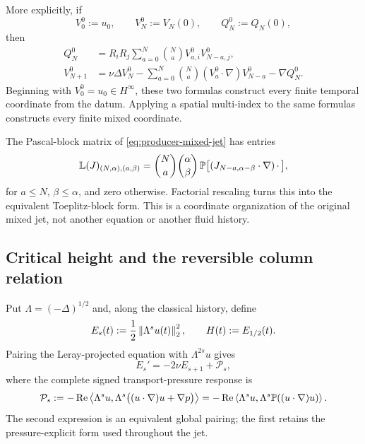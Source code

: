 More explicitly, if
\[
 V_0^0:=u_0,
 \qquad V_N^0:=V_N(0),
 \qquad Q_N^0:=Q_N(0),
\]
then
\begin{align}
 Q_N^0
 &=R_iR_j\sum_{a=0}^{N}\binom NaV_{a,i}^0V_{N-a,j}^0,
 \label{eq:initial-pressure-jet}\\
 V_{N+1}^0
 &=\nu\Delta V_N^0
 -\sum_{a=0}^{N}\binom Na(V_a^0\cdot\nabla)V_{N-a}^0
 -\nabla Q_N^0.
 \label{eq:initial-velocity-jet}
\end{align}
Beginning with \(V_0^0=u_0\in H^\infty\), these two formulas construct
every finite temporal coordinate from the datum.  Applying a spatial
multi-index to the same formulas constructs every finite mixed coordinate.

The Pascal-block matrix of \eqref{eq:producer-mixed-jet} has entries
\begin{equation}
 \mathbb L(J)_{(N,\alpha),(a,\beta)}
 =\binom Na\binom\alpha\beta\,
 \mathbb P\bigl[(J_{N-a,\alpha-\beta}\cdot\nabla)\,\cdot\,\bigr],
 \label{eq:pascal-block}
\end{equation}
for \(a\leq N\), \(\beta\leq\alpha\), and zero otherwise.  Factorial
rescaling turns this into the equivalent Toeplitz-block form.  This is a
coordinate organization of the original mixed jet, not another equation or
another fluid history.

\subsection{Critical height and the reversible column relation}

Put \(\Lambda=(-\Delta)^{1/2}\) and, along the classical history, define
\begin{equation}
 E_s(t):=\frac12\left\lVert \Lambda^su(t)\right\rVert_2^2,
 \qquad H(t):=E_{1/2}(t).
 \label{eq:producer-height-definitions}
\end{equation}
Pairing the Leray-projected equation with \(\Lambda^{2s}u\) gives
\begin{equation}
 E_s'=-2\nu E_{s+1}+\mathcal P_s,
 \label{eq:producer-sobolev-balance}
\end{equation}
where the complete signed transport-pressure response is
\begin{equation}
 \mathcal P_s
 :=-\operatorname{Re}\left\langle \Lambda^su,\Lambda^s\bigl((u\cdot\nabla)u+\nabla p\bigr)\right\rangle
 =-\operatorname{Re}\left\langle \Lambda^su,\Lambda^s\mathbb P((u\cdot\nabla)u)\right\rangle.
 \label{eq:producer-current}
\end{equation}
The second expression is an equivalent global pairing; the first retains the
pressure-explicit form used throughout the jet.

